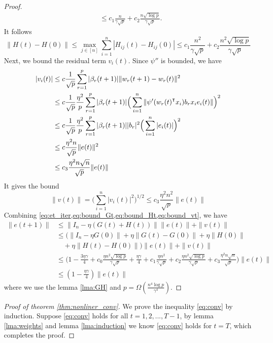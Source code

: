 \begin{proof}
\begin{equation*}
\begin{aligned}
    &\leq c_1 \frac{n}{\gamma\sqrt p} + c_2\frac{n\sqrt{\log p}}{\gamma\sqrt p}.
\end{aligned}
\end{equation*}
It follows
\begin{equation}\label{eq:bound_Ht}
    \|H(t)-H(0)\| \leq \max_{j \in [n]}\sum_{i=1}^n|H_{ij}(t) - H_{ij}(0)| \leq c_1 \frac{n^2}{\gamma\sqrt p} + c_2\frac{n^2\sqrt{\log p}}{\gamma\sqrt p}
\end{equation}
Next, we bound the residual term $v_i(t)$. Since $\psi''$ is bounded, we have
\begin{equation*}
\begin{aligned}
    |v_i(t)|
    &\leq c\frac{1}{\sqrt p}\sum_{r=1}^p|\beta_r(t+1)|\|w_r(t+1)-w_r(t)\|^2 \\
    &\leq c\frac{1}{\sqrt p}\frac{\eta^2}{p}\sum_{r=1}^p|\beta_r(t+1)|\Big(\sum_{i=1}^n\|\psi'(w_r(t)\transpose x_i)b_rx_ie_i(t)\|\Big)^2 \\
    &\leq c\frac{1}{\sqrt p}\frac{\eta^2}{p}\sum_{r=1}^p|\beta_r(t+1)||b_r|^2\Big(\sum_{i=1}^n|e_i(t)|\Big)^2 \\
    &\leq c\frac{\eta^2n}{\sqrt p}\|e(t)\|^2 \\
    &\leq c_3\frac{\eta^2n\sqrt n}{\sqrt p}\|e(t)\|
\end{aligned}
\end{equation*}
It gives the bound
\begin{equation}\label{eq:bound_vt}
    \|v(t)\| =\Big(\sum_{i=1}^n|v_i(t)|^2\Big)^{1/2} \leq c_3\frac{\eta^2n^2}{\sqrt p}\|e(t)\|
\end{equation}
Combining \cref{eq:et_iter,eq:bound_Gt,eq:bound_Ht,eq:bound_vt}, we have
\begin{equation*}
\begin{aligned}
\|e(t+1)\| 
&\leq \|I_n-\eta (G(t)+H(t))\|\|e(t)\|+\|v(t)\| \\
&\leq \Big(\|I_n-\eta G(0)\|+\eta\|G(t)-G(0)\|+\eta\|H(0)\| \\
&\quad +\eta\|H(t)-H(0)\|\Big)\|e(t)\| + \|v(t)\| \\
&\leq \Big( 1-\frac{3\eta\gamma}{4}+c_0\frac{\eta n^2\sqrt{\log p}}{\gamma\sqrt p}+\frac{\eta\gamma}{4}+c_1\frac{\eta n^2}{\gamma\sqrt p} + c_2\frac{\eta n^2\sqrt{\log p}}{\gamma\sqrt p}+c_3\frac{\eta^2n\sqrt n}{\sqrt p}\Big)\|e(t)\|  \\
&\leq(1-\frac{\eta\gamma}{4})\|e(t)\|
\end{aligned}
\end{equation*}
where we use the lemma \ref{lma:GH} and $p=\Omega(\frac{n^4\log p}{\gamma^4})$.
\end{proof}

\begin{proof}[Proof of theorem \ref{thm:nonliner_conv}]
We prove the inequality \eqref{eq:conv} by induction. Suppose \eqref{eq:conv} holds for all $t=1,2,...,T-1$, by lemma \ref{lma:weights} and lemma \ref{lma:induction} we know \eqref{eq:conv} holds for $t=T$, which completes the proof.
\end{proof}

